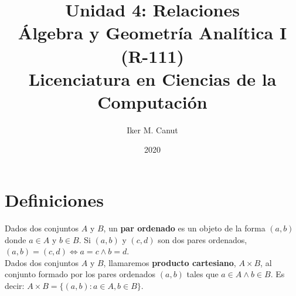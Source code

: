 \documentclass[11pt,a4paper]{article}
\author{Iker M. Canut}
\title{Unidad 4: Relaciones\\\'Algebra y Geometr\'ia Anal\'itica I (R-111)\\Licenciatura en Ciencias de la Computaci\'on}
\date{2020}
\begin{document}
\maketitle
\newpage

\section{Definiciones}
\noindent Dados dos conjuntos $A$ y $B$, un \textbf{par ordenado} es un objeto de la forma $(a,b)$ donde $a \in A$ y $b \in B$. Si $(a,b)$ y $(c,d)$ son dos pares ordenados, $(a,b) = (c,d) \iff a=c \land b=d$.\\

\noindent Dados dos conjuntos $A$ y $B$, llamaremos \textbf{producto cartesiano}, $A\times B$, al conjunto formado por los pares ordenados $(a,b)$ tales que $a\in A \land b\in B$. Es decir: $A\times B = \{(a,b):a\in A, b\in B\}$.\\
\end{document}
